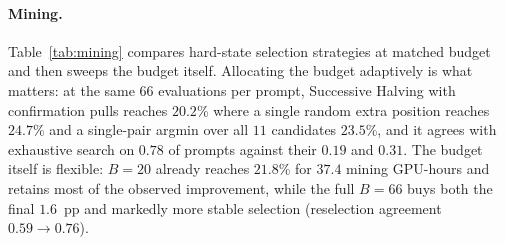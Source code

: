 \documentclass[11pt]{article}
\begin{document}
\paragraph{Mining.}
Table~\ref{tab:mining} compares hard-state selection strategies at matched budget
and then sweeps the budget itself. Allocating the budget adaptively is what
matters: at the same \(66\) evaluations per prompt, Successive Halving with
confirmation pulls reaches \(20.2\)\% where a single random extra position reaches
\(24.7\)\% and a single-pair argmin over all \(11\) candidates \(23.5\)\%, and it
agrees with exhaustive search on \(0.78\) of prompts against their \(0.19\) and
\(0.31\). The budget itself is flexible: \(B{=}20\) already reaches \(21.8\)\% for
\(37.4\) mining GPU-hours and retains most of the observed improvement, while the full \(B{=}66\) buys both the final \(1.6\)~pp and markedly
more stable selection (reselection agreement \(0.59 \to 0.76\)).
\end{document}
